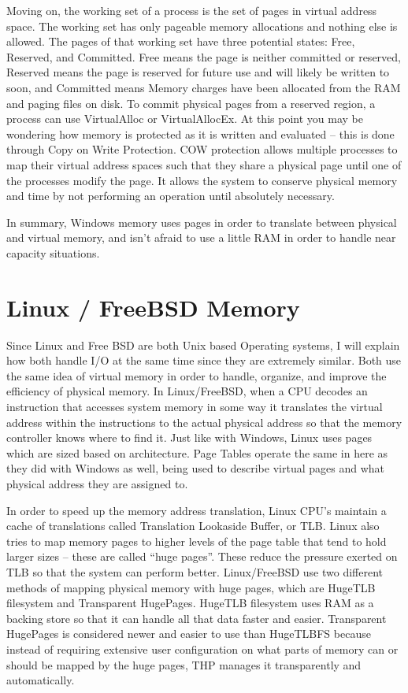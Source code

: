 \documentclass[onecolumn, draftclsnofoot,10pt, compsoc]{IEEEtran}
\begin{document}
Moving on, the working set of a process is the set of pages in virtual address space. The working set has only pageable memory allocations and nothing else is allowed. The pages of that working set have three potential states: Free, Reserved, and Committed. Free means the page is neither committed or reserved, Reserved means the page is reserved for future use and will likely be written to soon, and Committed means Memory charges have been allocated from the RAM and paging files on disk. To commit physical pages from a reserved region, a process can use VirtualAlloc or VirtualAllocEx. At this point you may be wondering how memory is protected as it is written and evaluated – this is done through Copy on Write Protection. COW protection allows multiple processes to map their virtual address spaces such that they share a physical page until one of the processes modify the page. It allows the system to conserve physical memory and time by not performing an operation until absolutely necessary.\cite{WindowsDev}


In summary, Windows memory uses pages in order to translate between physical and virtual memory, and isn't afraid to use a little RAM in order to handle near capacity situations.

\section{Linux / FreeBSD Memory}
Since Linux and Free BSD are both Unix based Operating systems, I will explain how both handle I/O at the same time since they are extremely similar. Both use the same idea of virtual memory in order to handle, organize, and improve the efficiency of physical memory. In Linux/FreeBSD, when a CPU decodes an instruction that accesses system memory in some way it translates the virtual address within the instructions to the actual physical address so that the memory controller knows where to find it. Just like with Windows, Linux uses pages which are sized based on architecture. Page Tables operate the same in here as they did with Windows as well, being used to describe virtual pages and what physical address they are assigned to. \cite{linux}

In order to speed up the memory address translation, Linux CPU’s maintain a cache of translations called Translation Lookaside Buffer, or TLB. Linux also tries to map memory pages to higher levels of the page table that tend to hold larger sizes – these are called “huge pages”. These reduce the pressure exerted on TLB so that the system can perform better. Linux/FreeBSD use two different methods of mapping physical memory with huge pages, which are HugeTLB filesystem and Transparent HugePages. HugeTLB filesystem uses RAM as a backing store so that it can handle all that data faster and easier. Transparent HugePages is considered newer and easier to use than HugeTLBFS because instead of requiring extensive user configuration on what parts of memory can or should be mapped by the huge pages, THP manages it transparently and automatically. \cite{linux}
\end{document}
